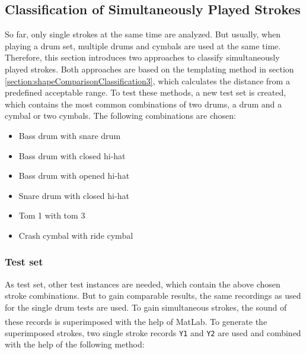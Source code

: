 \subsection{Classification of Simultaneously Played Strokes} \label{section:methodCombined}

So far, only single strokes at the same time are analyzed. But usually, when playing a drum set, multiple drums and cymbals are used at the same time. Therefore, this section introduces two approaches to classify simultaneously played strokes. Both approaches are based on the templating method in section \ref{section:shapeComparisonClassification3}, which calculates the distance from a predefined acceptable range. To test these methods, a new test set is created, which contains the most common combinations of two drums, a drum and a cymbal or two cymbals. The following combinations are chosen:

\begin{itemize}
  \item Bass drum with snare drum
	\item Bass drum with closed hi-hat
	\item Bass drum with opened hi-hat
	\item Snare drum with closed hi-hat
	\item Tom 1 with tom 3
	\item Crash cymbal with ride cymbal
\end{itemize}

\subsubsection{Test set}
\label{section:multipleTestset}
As test set, other test instances are needed, which contain the above chosen stroke combinations. But to gain comparable results, the same recordings as used for the single drum tests are used. To gain simultaneous strokes, the sound of these records is superimposed with the help of MatLab\textsuperscript{\textregistered}. To generate the superimposed strokes, two single stroke records \lstinline{Y1} and \lstinline{Y2} are used and combined with the help of the following method:

